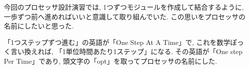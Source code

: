 \documentclass[../specifications.tex]{subfiles}
\begin{document}
  今回のプロセッサ設計演習では, 1つずつモジュールを作成して結合するように, 
  一歩ずつ前へ進めればいいと意識して取り組んでいた.
  この思いをプロセッサの名前にしたいと思った.

  「1つステップずつ進む」の英語が「One Step At A Time」で, 
  これを数学ぽっく言い換えれば, 「1単位時間あたり1ステップ」になる.
  その英語が「One step Per Time」であり, 頭文字の「opt」を取ってプロセッサの名前にした.
\end{document}
